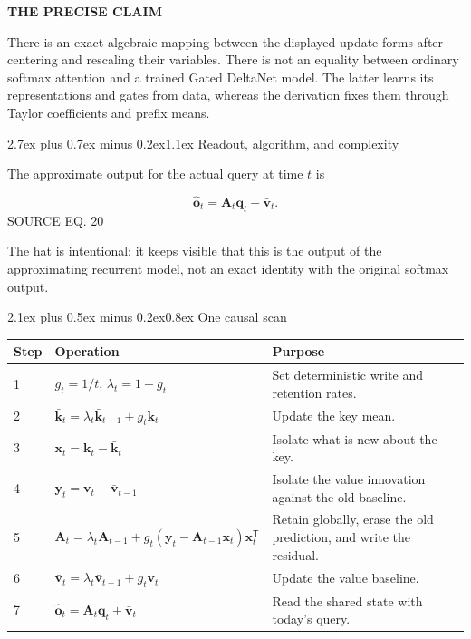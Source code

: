 \documentclass[11pt]{article}
\makeatletter
\newcommand{\vect}[1]{\bm{#1}}
\newcommand{\trans}{^{\mathsf T}}
\newcommand{\sourceeq}[1]{\hfill{\sffamily\scriptsize\color{Muted}SOURCE EQ. #1}}
\newenvironment{redbox}[1]{%
  \def\FrameCommand{\fcolorbox{Red}{RedTint}}%
  \MakeFramed{\advance\hsize-\width\FrameRestore}%
  {\sffamily\bfseries\color{Red}#1}\par\smallskip
}{\endMakeFramed}
\renewcommand\section{\@startsection{section}{1}{0pt}%
  {2.7ex plus 0.7ex minus 0.2ex}{1.1ex}%
  {\normalfont\sffamily\Large\bfseries\color{Ink}}}
\renewcommand\subsection{\@startsection{subsection}{2}{0pt}%
  {2.1ex plus 0.5ex minus 0.2ex}{0.8ex}%
  {\normalfont\sffamily\large\bfseries\color{Ink}}}
\makeatother
\begin{document}
\begin{redbox}{THE PRECISE CLAIM}
  There is an exact algebraic mapping between the displayed update forms after
  centering and rescaling their variables. There is not an equality between
  ordinary softmax attention and a trained Gated DeltaNet model. The latter
  learns its representations and gates from data, whereas the derivation fixes
  them through Taylor coefficients and prefix means.
\end{redbox}

\section{Readout, algorithm, and complexity}

The approximate output for the actual query at time $t$ is

\begin{equation}
  \widehat{\vect o}_t=\vect A_t\vect q_t+\bar{\vect v}_t.
  \tag{20}\label{eq:readout}
\end{equation}
\sourceeq{20}

The hat is intentional: it keeps visible that this is the output of the
approximating recurrent model, not an exact identity with the original softmax
output.

\subsection{One causal scan}

\begin{longtable}{@{}P{10mm}P{50mm}P{78mm}@{}}
\toprule
\textbf{Step} & \textbf{Operation} & \textbf{Purpose} \\
 & $g_t=1/t$, $\lambda_t=1-g_t$ & Set deterministic write and retention rates. \\
2 & $\bar{\vect k}_t=\lambda_t\bar{\vect k}_{t-1}+g_t\vect k_t$ & Update the key mean. \\
3 & $\vect x_t=\vect k_t-\bar{\vect k}_t$ & Isolate what is new about the key. \\
4 & $\vect y_t=\vect v_t-\bar{\vect v}_{t-1}$ & Isolate the value innovation against the old baseline. \\
5 & $\vect A_t=\lambda_t\vect A_{t-1}+g_t(\vect y_t-\vect A_{t-1}\vect x_t)\vect x_t\trans$ & Retain globally, erase the old prediction, and write the residual. \\
6 & $\bar{\vect v}_t=\lambda_t\bar{\vect v}_{t-1}+g_t\vect v_t$ & Update the value baseline. \\
7 & $\widehat{\vect o}_t=\vect A_t\vect q_t+\bar{\vect v}_t$ & Read the shared state with today's query. \\
\bottomrule
\end{longtable}
\end{document}
